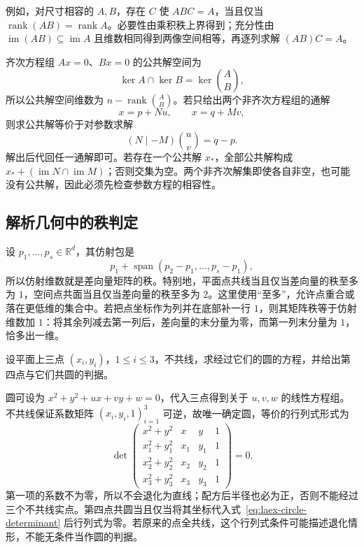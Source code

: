 例如，对尺寸相容的 $A,B$，存在 $C$ 使 $ABC=A$，当且仅当 $\operatorname{rank}(AB)=\operatorname{rank}A$。必要性由乘积秩上界得到；充分性由 $\operatorname{im}(AB)\subseteq\operatorname{im}A$ 且维数相同得到两像空间相等，再逐列求解 $(AB)C=A$。

齐次方程组 $Ax=0$、$Bx=0$ 的公共解空间为
\[
\ker A\cap\ker B=\ker\binom AB,
\]
所以公共解空间维数为 $n-\operatorname{rank}\binom AB$。若只给出两个非齐次方程组的通解
\[
x=p+Nu,\qquad x=q+Mv,
\]
则求公共解等价于对参数求解
\begin{equation}
\label{eq:laex-common-affine}
(N\mid-M)\binom uv=q-p.
\end{equation}
解出后代回任一通解即可。若存在一个公共解 $x_*$，全部公共解构成 $x_*+(\operatorname{im}N\cap\operatorname{im}M)$；否则交集为空。两个非齐次解集即使各自非空，也可能没有公共解，因此必须先检查参数方程的相容性。

\subsection{解析几何中的秩判定}

设 $p_1,\ldots,p_s\in\mathbb R^d$，其仿射包是
\[
p_1+\operatorname{span}(p_2-p_1,\ldots,p_s-p_1),
\]
所以仿射维数就是差向量矩阵的秩。特别地，平面点共线当且仅当差向量的秩至多为 $1$，空间点共面当且仅当差向量的秩至多为 $2$。这里使用“至多”，允许点重合或落在更低维的集合中。若把点坐标作为列并在底部补一行 $1$，则其矩阵秩等于仿射维数加 $1$：将其余列减去第一列后，差向量的末分量为零，而第一列末分量为 $1$，恰多出一维。

\begin{example}
\label{ex:laex-circle}
设平面上三点 $(x_i,y_i)$，$1\le i\le3$，不共线，求经过它们的圆的方程，并给出第四点与它们共圆的判据。
\end{example}

\begin{solve}
圆可设为 $x^2+y^2+ux+vy+w=0$，代入三点得到关于 $u,v,w$ 的线性方程组。不共线保证系数矩阵 $(x_i,y_i,1)_{i=1}^3$ 可逆，故唯一确定圆，等价的行列式形式为
\begin{equation}
\label{eq:laex-circle-determinant}
\det\begin{pmatrix}
x^2+y^2&x&y&1\\
x_1^2+y_1^2&x_1&y_1&1\\
x_2^2+y_2^2&x_2&y_2&1\\
x_3^2+y_3^2&x_3&y_3&1
\end{pmatrix}=0.
\end{equation}
第一项的系数不为零，所以不会退化为直线；配方后半径也必为正，否则不能经过三个不共线实点。第四点共圆当且仅当将其坐标代入式~\eqref{eq:laex-circle-determinant} 后行列式为零。若原来的点全共线，这个行列式条件可能描述退化情形，不能无条件当作圆的判据。
\end{solve}

